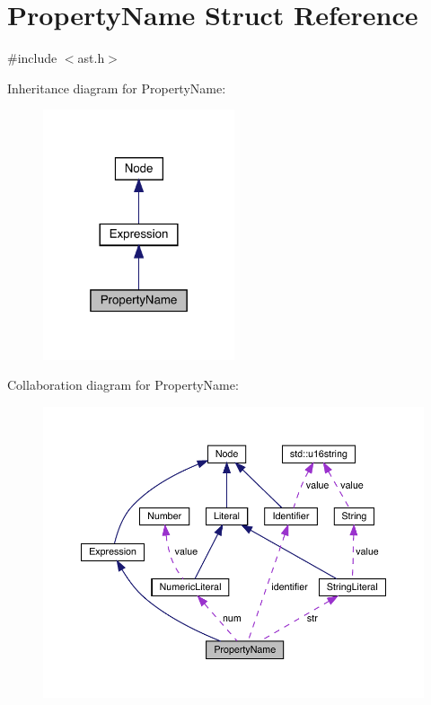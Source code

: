 \hypertarget{struct_property_name}{}\section{Property\+Name Struct Reference}
\label{struct_property_name}


{\ttfamily \#include $<$ast.\+h$>$}



Inheritance diagram for Property\+Name\+:
\nopagebreak
\begin{figure}[H]
\begin{center}
\leavevmode
\includegraphics[width=160pt]{struct_property_name__inherit__graph}
\end{center}
\end{figure}


Collaboration diagram for Property\+Name\+:
\nopagebreak
\begin{figure}[H]
\begin{center}
\leavevmode
\includegraphics[width=350pt]{struct_property_name__coll__graph}
\end{center}
\end{figure}
